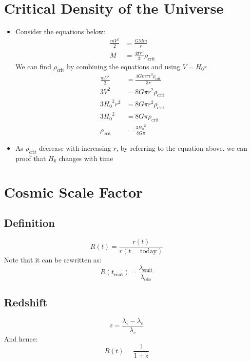\documentclass{article}
\begin{document}
\section{Critical Density of the Universe}
\begin{itemize}
    \item Consider the equations below:
    \begin{align}
        \frac{mV^2}{2}&=\frac{GMm}{r}\\
    M&=\frac{4 \pi r^3}{3} \rho_\text{crit}
    \end{align}
    We can find $\rho_\text{crit}$ by combining the equations and using $V=H_0r$
    \begin{align}
        \frac{mV^2}{2}&=\frac{4Gm\pi r^3 \rho_\text{crit}}{3r}\\
         3V^2&=8G\pi r^2 \rho_\text{crit}\\
         3{H_0}^2{r^2}&=8G\pi r^2 \rho_\text{crit}\\
          3{H_0}^2&=8G\pi\rho_\text{crit}\\
         \rho_\text{crit}&=\frac {3{H_0}^2}{8G\pi}
    \end{align}
    \item As $\rho_\text{crit}$ decrease with increasing $r$, by referring to the equation above, we can proof that $H_0$ changes with time
\end{itemize}
\section{Cosmic Scale Factor}
\subsection{Definition}
\begin{equation}
    R(t)=\frac{r(t)}{r(t=\text{today})}
    \end{equation}
    Note that it can be rewritten as:
\begin{equation}
    R(t_\text{emit})=\frac{\lambda_\text{emit}}{\lambda_\text{obs}}
\end{equation}
\subsection{Redshift}
\begin{equation}
z=\frac{\lambda_{\circ}-\lambda_e}{\lambda_e}
\end{equation}
And hence:
\begin{equation}
    R(t)=\frac{1}{1+z}
\end{equation}
\end{document}
